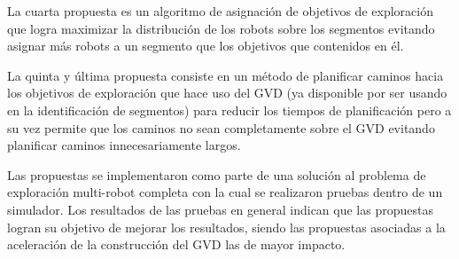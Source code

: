 La cuarta propuesta es un algoritmo de asignación de objetivos de exploración
que logra maximizar la distribución de los robots sobre los segmentos evitando
asignar más robots a un segmento que los objetivos que contenidos en él.

La quinta y última propuesta consiste en un método de planificar caminos hacia
los objetivos de exploración que hace uso del GVD (ya disponible por ser usando
en la identificación de segmentos) para reducir los tiempos de planificación
pero a su vez permite que los caminos no sean completamente sobre el GVD evitando
planificar caminos innecesariamente largos.

Las propuestas se implementaron como parte de una solución al problema de
exploración multi-robot completa con la cual se realizaron pruebas dentro de un
simulador. Los resultados de las pruebas en general indican que las propuestas
logran su objetivo de mejorar los resultados, siendo las propuestas asociadas a
la aceleración de la construcción del GVD las de mayor impacto.
